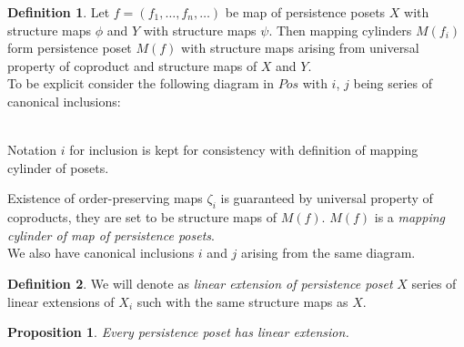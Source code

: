 \documentclass[a4paper, 12pt]{article}
\newtheorem{proposition}{Proposition}
\theoremstyle{definition}
\newtheorem{definition}{Definition}
\theoremstyle{remark}
\newcommand{\define}[1]{{\textit{#1}}}
\begin{document}
\begin{definition}
  Let $f = (f_1,\ldots,f_n,\ldots)$ be map of persistence posets $X$ with structure maps $\phi$ and $Y$ with structure maps $\psi$. Then mapping cylinders $M(f_i)$ form persistence poset $M(f)$ with structure maps arising from universal property of coproduct and structure maps of $X$ and $Y$.\\

  To be explicit consider the following diagram in $Pos$ with $i$, $j$ being series of canonical inclusions:\\
  \\
  Notation $i$ for inclusion is kept for consistency with definition of mapping cylinder of posets.

  Existence of order-preserving maps $\zeta_i$ is guaranteed by universal property of coproducts, they are set to be structure maps of $M(f)$. $M(f)$ is a \define{mapping cylinder of map of persistence posets}.\\

  We also have canonical inclusions $i$ and $j$ arising from the same diagram.
\end{definition}

\begin{definition}
  We will denote as \define{linear extension of persistence poset} $X$ series of linear extensions of $X_i$ such with the same structure maps as $X$.
\end{definition}

\begin{proposition}
  Every persistence poset has linear extension.
\end{proposition}
\end{document}
